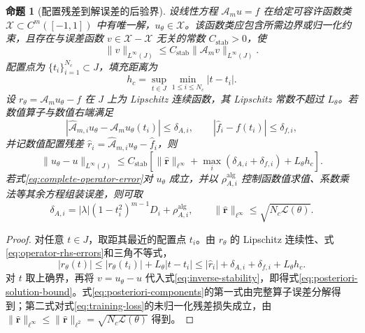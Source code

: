 \documentclass[UTF8,fontset=none,10.5pt,a4paper]{ctexart}
\numberwithin{equation}{section}
\newtheorem{proposition}{命题}
\begin{document}
\begin{proposition}[配置残差到解误差的后验界]
设线性方程 $\mathcal A_m u=f$ 在给定可容许函数类 $\mathscr X\subset C^m([-1,1])$ 中有唯一解，$u_\theta\in\mathscr X$。该函数类应包含所需边界或归一化约束，且存在与误差函数 $v\in\mathscr X-\mathscr X$ 无关的常数 $C_{\mathrm{stab}}>0$，使
\begin{equation}
\|v\|_{L^\infty(J)}\le C_{\mathrm{stab}}
\|\mathcal A_m v\|_{L^\infty(J)}.
\label{eq:inverse-stability}
\end{equation}
配置点为 $\{t_i\}_{i=1}^{N_c}\subset J$，填充距离为
\begin{equation}
h_c=\sup_{t\in J}\min_{1\le i\le N_c}|t-t_i|.
\label{eq:fill-distance}
\end{equation}
设 $r_\theta=\mathcal A_m u_\theta-f$ 在 $J$ 上为 Lipschitz 连续函数，其 Lipschitz 常数不超过 $L_\theta$。若数值算子与数值右端满足
\begin{equation}
|\widehat{\mathcal A}_{m,i}u_\theta-\mathcal A_m u_\theta(t_i)|
\le\delta_{A,i},
\qquad
|\widehat f_i-f(t_i)|\le\delta_{f,i},
\label{eq:operator-rhs-errors}
\end{equation}
并记数值配置残差
$\widehat r_i=\widehat{\mathcal A}_{m,i}u_\theta-\widehat f_i$，则
\begin{equation}
\|u_\theta-u\|_{L^\infty(J)}
\le C_{\mathrm{stab}}
\left[
\|\widehat{\bm r}\|_{\ell^\infty}
+\max_i(\delta_{A,i}+\delta_{f,i})
+L_\theta h_c
\right].
\label{eq:posteriori-solution-bound}
\end{equation}
若式\eqref{eq:complete-operator-error}对 $u_\theta$ 成立，并以 $\rho_{A,i}^{\mathrm{alg}}$ 控制函数值求值、系数乘法等其余方程组装误差，则可取
\begin{equation}
\delta_{A,i}
= |\lambda|(1-t_i^2)^{m-1}D_i+\rho_{A,i}^{\mathrm{alg}},
\qquad
\|\widehat{\bm r}\|_{\ell^\infty}
\le \sqrt{N_c\mathcal L(\theta)}.
\label{eq:posteriori-components}
\end{equation}
\end{proposition}
\begin{proof}
对任意 $t\in J$，取距其最近的配置点 $t_i$。由 $r_\theta$ 的 Lipschitz 连续性、式\eqref{eq:operator-rhs-errors}和三角不等式，
\[
|r_\theta(t)|
\le |r_\theta(t_i)|+L_\theta|t-t_i|
\le |\widehat r_i|+\delta_{A,i}+\delta_{f,i}+L_\theta h_c.
\]
对 $t$ 取上确界，再将 $v=u_\theta-u$ 代入式\eqref{eq:inverse-stability}，即得式\eqref{eq:posteriori-solution-bound}。式\eqref{eq:posteriori-components}的第一式由完整算子误差分解得到；第二式对式\eqref{eq:training-loss}的未归一化残差损失成立，由 $\|\widehat{\bm r}\|_{\ell^\infty}\le\|\widehat{\bm r}\|_{\ell^2}=\sqrt{N_c\mathcal L(\theta)}$ 得到。
\end{proof}
\end{document}
